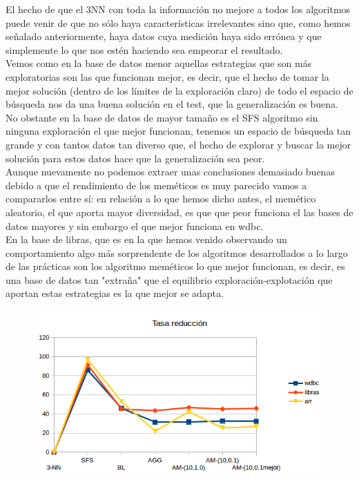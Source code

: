 \documentclass[10pt,a4paper]{article}
\begin{document}
El hecho de que el 3NN con toda la información no mejore a todos los algoritmos puede venir de que no sólo haya características irrelevantes sino que, como hemos señalado anteriormente, haya datos cuya medición haya sido errónea y que simplemente lo que nos estén haciendo sea empeorar el resultado.\\

Vemos como en la base de datos menor aquellas estrategias que son más exploratorias son las que funcionan mejor, es decir, que el hecho de tomar la mejor solución (dentro de los límites de la exploración claro) de todo el espacio de búsqueda nos da una buena solución en el test, que la generalización es buena. No obstante en la base de datos de mayor tamaño es el SFS algoritmo sin ninguna exploración el que mejor funcionan, tenemos un espacio de búsqueda tan grande y con tantos datos tan diverso que, el hecho de explorar y buscar la mejor solución para estos datos hace que la generalización sea peor.\\

Aunque nuevamente no podemos extraer unas conclusiones demasiado buenas debido a que el rendimiento de los meméticos es muy parecido vamos a compararlos entre sí: en relación a lo que hemos dicho antes, el memético aleatorio, el que aporta mayor diversidad, es que que peor funciona el las bases de datos mayores y sin embargo el que mejor funciona en wdbc.\\

En la base de libras, que es en la que hemos venido observando un comportamiento algo más sorprendente de los algoritmos desarrollados a lo largo de las prácticas son los algoritmo meméticos lo que mejor funcionan, es decir, es una base de datos tan "extraña" que el equilibrio exploración-explotación que aportan estas estrategias es la que mejor se adapta.\\

\begin{figure}[H]
\centering
\includegraphics[width=130mm]{reduccion_am.png}
\end{figure}
\end{document}
